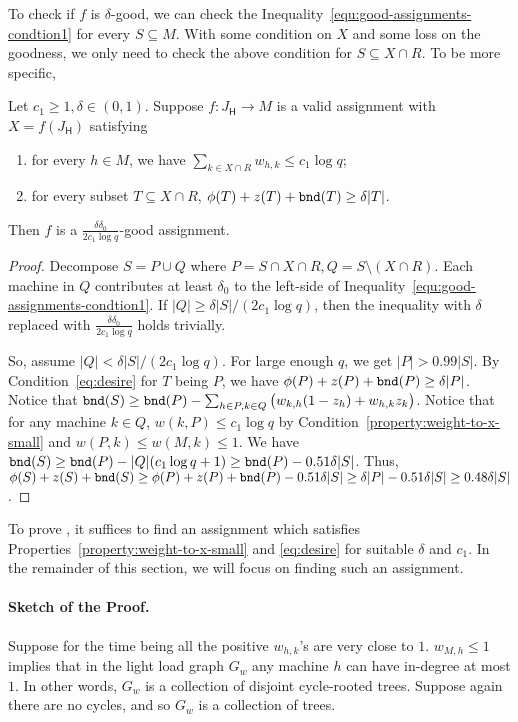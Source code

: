 \documentclass[11pt]{article}
\newcounter{prop}
\newenvironment{properties}
{
\addtocounter{prop}{1}
\begin{enumerate}[labelindent=0pt,label=(\Alph{prop}\arabic*),itemindent=1em,itemsep=-1pt]
}
{
\end{enumerate}
}
\newcommand{\sfH}{{\mathsf H}}
\begin{document}
To check if $f$ is $\delta$-good, we can check the Inequality~\eqref{equ:good-assignments-condtion1} for every $S \subseteq M$.   With some condition on $X$ and some loss on the goodness, we only need to check the above condition for $S \subseteq X \cap R$.  To be more specific,

\begin{lemma}
\label{lem:reduce-to-star}
Let $c_1 \geq 1, \delta\in (0, 1)$.  Suppose $f : J_\sfH \to M$ is a valid assignment with $X=f(J_\sfH)$ satisfying
\begin{properties}
\item for every $h \in M$, we have $\sum_{k\in X\cap R} w_{h,k} \leq c_1 \log q$; \label{property:weight-to-x-small}
\item for every subset $T \subseteq X \cap R$,
$\phi(T) + z(T) + {\tt bnd}(T)  \geq \delta|T|$. \label{eq:desire}
\end{properties}
Then $f$ is a $\frac{\delta\delta_0}{2c_1\log q}$-good assignment.
\end{lemma}

\begin{proof}
 Decompose $S = P \cup Q$ where $P = S \cap X \cap R, Q = S \setminus (X \cap R)$. Each machine in $Q$ contributes at least $\delta_0$ to the left-side of Inequality~\eqref{equ:good-assignments-condtion1}. If $|Q| \geq \delta|S|/(2c_1 \log q)$, then the inequality with $\delta$ replaced with $\frac{\delta\delta_0}{2c_1\log q}$ holds trivially.  

  So, assume $|Q| < \delta|S|/(2c_1 \log q)$. 
 For large enough $q$, we get $|P| > 0.99|S|$. 
  By Condition~\ref{eq:desire} for $T$ being $P$,  we have $\phi(P) + z(P) + {\tt bnd}(P) \geq \delta|P|$.  Notice that ${\tt bnd}(S) \geq {\tt bnd}(P) - \sum_{h \in P, k \in Q}\big(w_{k,h}(1-z_h) + w_{h,k}z_k\big)$.  Notice that for any machine $k\in Q$,  $w(k, P) \leq c_1 \log q$ by Condition~\ref{property:weight-to-x-small} and $w(P, k) \leq w(M, k) \leq 1$. We have ${\tt bnd}(S) \geq {\tt bnd}(P) - |Q|(c_1 \log q + 1) \geq {\tt bnd}(P) - 0.51\delta|S|$. Thus, $\phi(S) + z(S) + {\tt bnd}(S) \geq \phi(P) + z(P) + {\tt bnd}(P) - 0.51\delta|S| \geq \delta|P| - 0.51\delta|S| \geq 0.48\delta|S|$.
\end{proof}

To prove ,  it suffices to find an assignment  which satisfies Properties~\ref{property:weight-to-x-small} and \ref{eq:desire} for suitable $\delta$ and $c_1$. In the remainder of this section, we will focus on finding such an assignment.

\paragraph{Sketch of the Proof.}  Suppose for the time being all the positive $w_{h,k}$'s are very close to $1$. $w_{M, h} \leq 1$  implies that in the light load graph $G_w$ any machine $h$ can have in-degree at most $1$. In other words, $G_w$ is a collection of disjoint cycle-rooted trees. Suppose again there are no cycles, and so $G_w$ is a collection of trees. 
\end{document}
